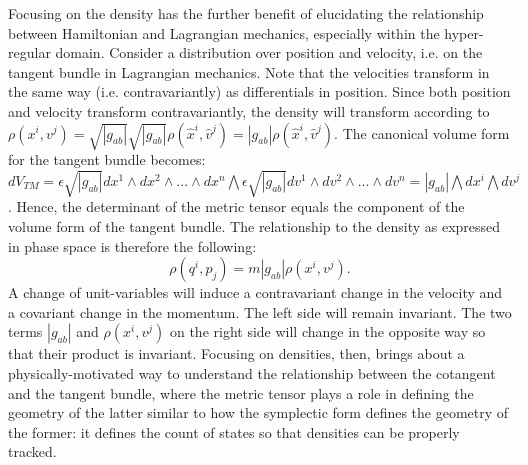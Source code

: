 \documentclass[letterpaper]{article}
\begin{document}

Focusing on the density has the further benefit of elucidating the relationship between Hamiltonian and Lagrangian mechanics, especially within the hyper-regular domain. Consider a distribution over position and velocity, i.e. on the tangent bundle in Lagrangian mechanics. Note that the velocities transform in the same way (i.e. contravariantly) as differentials in position. Since both position and velocity transform contravariantly, the density will transform according to $\rho(x^i, v^j) = \sqrt{|g_{ab}|} \sqrt{|g_{ab}|} \rho(\hat{x}^i, \hat{v}^j) = |g_{ab}| \rho(\hat{x}^i, \hat{v}^j)$. The canonical volume form for the tangent bundle becomes: $dV_{TM} = \epsilon \sqrt{|g_{ab}|} dx^1 \wedge dx^2 \wedge ... \wedge dx^n \bigwedge \epsilon \sqrt{|g_{ab}|} dv^1 \wedge dv^2 \wedge ... \wedge dv^n = |g_{ab}| \bigwedge dx^i \bigwedge dv^j$. Hence, the determinant of the metric tensor equals the component of the volume form of the tangent bundle. The relationship to the density as expressed in phase space is therefore the following:
\begin{equation}
	\rho(q^i, p_j) = m |g_{ab}| \rho(x^i, v^j).
\end{equation}
A change of unit-variables will induce a contravariant change in the velocity and a covariant change in the momentum. The left side will remain invariant. The two terms $|g_{ab}|$ and  $\rho(x^i, v^j)$ on the right side will change in the opposite way so that their product is invariant. Focusing on densities, then, brings about a physically-motivated way to understand the relationship between the cotangent and the tangent bundle, where the metric tensor plays a role in defining the geometry of the latter similar to how the symplectic form defines the geometry of the former: it defines the count of states so that densities can be properly tracked.
\end{document}
